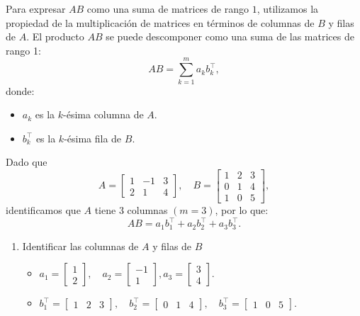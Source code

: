 \begin{enumerate}[label=\color{red}\textbf{\arabic*)}]
Para expresar $AB$ como una suma de matrices de rango $1$, utilizamos la propiedad de la multiplicación de matrices en términos de columnas de  $B$ y filas de  $A$. El producto  $AB$ se puede descomponer como una suma de las matrices de rango 1:  \[
AB=\sum_{k=1}^{m}a_kb_k^\intercal, 
\]donde: 
\begin{itemize}[label=\textbullet]
    \item $a_k$ es la  $k$-ésima columna de  $A$.
    \item  $b_k^\intercal$ es la $k$-ésima fila de  $B$.
\end{itemize}
Dado que \[
A=\begin{bmatrix} 
    1 & -1 & 3\\
    2 & 1 & 4
\end{bmatrix},\quad B=\begin{bmatrix} 
    1 & 2 & 3\\
    0 & 1 & 4\\
    1 & 0 & 5
\end{bmatrix},  
\] identificamos que $A$ tiene 3 columnas  $(m=3)$, por lo que:  \[
AB=a_1b_1^\intercal+a_2b_2^\intercal+a_3b_3^\intercal.
\] 
\begin{enumerate}[label=Paso \arabic*:]
    \item Identificar las columnas de $A$ y filas de  $B$
         \begin{itemize}[label=\textbullet]
            \item $a_1=\begin{bmatrix} 
            1\\
            2
            \end{bmatrix},\quad a_2=\begin{bmatrix} 
            -1\\
            1
            \end{bmatrix}, a_3 =\begin{bmatrix} 
            3\\
            4
            \end{bmatrix}  $.
        \item $b_1^\intercal=\begin{bmatrix} 
                1 & 2 & 3 
        \end{bmatrix}, \quad b_2^\intercal=\begin{bmatrix} 
                0 & 1 & 4 
        \end{bmatrix},\quad b_3^\intercal=\begin{bmatrix} 
                1 & 0 & 5 
        \end{bmatrix}$.

\end{itemize}
\end{enumerate}
\end{enumerate}
